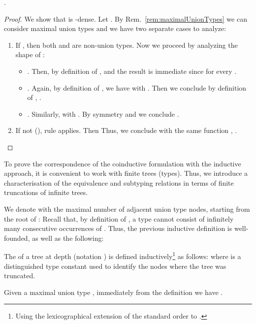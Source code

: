 \begin{lemma}
\label{lem:eqImpliesSub}
.
\end{lemma}

\begin{proof}
We show that  is
-dense. Let . By
Rem.~\ref{rem:maximalUnionTypes} we can consider maximal union types  and we have two separate cases to analyze:
\begin{enumerate}
  \item If , then both  and  are non-union types. Now we
  proceed by analyzing the shape of :
  \begin{itemize}
    \item . Then, by definition of ,  and the
    result is immediate since  for every .
    
    \item . Again, by definition of ,
    we have  with . Then we conclude by definition
    of , .
    
    \item . Similarly,  with . By symmetry  and we conclude .
  \end{itemize}
  
  \item If not (\ie ), rule  applies. Then  Thus, we conclude with the same function , .
\end{enumerate}
\end{proof}



To prove the correspondence of the coinductive formulation with the inductive
approach, it is convenient to work with finite trees (types). Thus, we
introduce a characterisation of the equivalence and subtyping relations in
terms of finite truncations of infinite trees.

We denote with  the maximal number of adjacent union
type nodes, starting from the root of :  Recall that, by definition of , a type cannot consist of infinitely
many consecutive occurrences of . Thus, the previous inductive
definition is well-founded, as well as the following:

\begin{definition}
\label{def:treeCut}
The  of a tree  at depth  (notation
) is defined inductively\footnote{Using the lexicographical
extension of the standard order to .} as
follows:  where  is a distinguished type
constant used to identify the nodes where the tree was truncated.
\end{definition}

\begin{remark}
\label{rem:cutMaximalUnionTypes}
Given a maximal union type , immediately from
the definition we have .
\end{remark}



